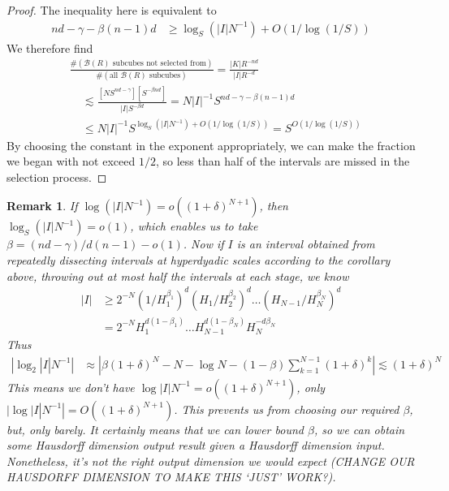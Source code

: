 \documentclass{article}
\theoremstyle{plain}
\theoremstyle{plain}
\newtheorem*{remark}{Remark}
\begin{document}
\begin{proof}
	The inequality here is equivalent to
	\begin{align*}
		nd - \gamma - \beta(n-1)d &\geq \log_S(|I|N^{-1}) + O(1/\log(1/S))
	\end{align*}
	We therefore find
	\begin{align*}
		&\frac{\# (\text{$\mathcal{B}(R)$ subcubes not selected from})}{\# (\text{all $\mathcal{B}(R)$ subcubes})} = \frac{|K| R^{-nd}}{|I|R^{-d}}\\
		&\ \ \ \ \ \lesssim \frac{[N S^{nd - \gamma}][S^{- \beta n d}]}{|I| S^{-\beta d}} = N |I|^{-1} S^{nd - \gamma - \beta (n-1)d}\\
		&\ \ \ \ \ \leq N |I|^{-1} S^{\log_S(|I|N^{-1}) + O(1/\log(1/S))} = S^{O(1/\log(1/S))}
	\end{align*}
	By choosing the constant in the exponent appropriately, we can make the fraction we began with not exceed $1/2$, so less than half of the intervals are missed in the selection process.
\end{proof}

\begin{remark}
	If $\log(|I|N^{-1}) = o((1 + \delta)^{N+1})$, then $\log_S(|I|N^{-1}) = o(1)$, which enables us to take $\beta = (nd - \gamma)/d(n-1) - o(1)$. Now if $I$ is an interval obtained from repeatedly dissecting intervals at hyperdyadic scales according to the corollary above, throwing out at most half the intervals at each stage, we know
	\begin{align*}
		|I| &\geq 2^{-N} (1/H_1^{\beta_1})^d(H_1/H_2^{\beta_2})^d \dots (H_{N-1}/H_N^{\beta_N})^d\\
		&= 2^{-N} H_1^{d(1 - \beta_1)} \dots H_{N-1}^{d(1 - \beta_N)} H_N^{-d \beta_N}
	\end{align*}
	Thus
	\begin{align*}
		|\log_2 |I|N^{-1}| &\approx \left| \beta (1 + \delta)^N - N - \log N - (1 - \beta) \sum_{k = 1}^{N-1} (1 + \delta)^k \right| \lesssim (1 + \delta)^N
	\end{align*}
	This means we don't have $\log |I|N^{-1} = o((1 + \delta)^{N+1})$, only $|\log |I|N^{-1}| = O((1 + \delta)^{N+1})$. This prevents us from choosing our required $\beta$, but, only {\it barely}. It certainly means that we can lower bound $\beta$, so we can obtain some Hausdorff dimension output result given a Hausdorff dimension input. Nonetheless, it's not the right output dimension we would expect (CHANGE OUR HAUSDORFF DIMENSION TO MAKE THIS `JUST' WORK?).
\end{remark}
\end{document}
